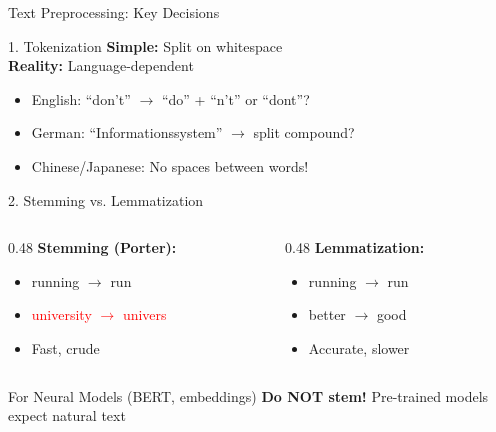\documentclass[aspectratio=169]{beamer}
\begin{document}
\begin{frame}[shrink=25]{Text Preprocessing: Key Decisions}
\begin{block}{1. Tokenization}
\textbf{Simple:} Split on whitespace \\
\textbf{Reality:} Language-dependent
\begin{itemize}
    \item English: ``don't'' $\rightarrow$ ``do'' + ``n't'' or ``dont''?
    \item German: ``Informationssystem'' $\rightarrow$ split compound?
    \item Chinese/Japanese: No spaces between words!
\end{itemize}
\end{block}

\begin{block}{2. Stemming vs. Lemmatization}
\begin{columns}
\begin{column}{0.48\textwidth}
\textbf{Stemming (Porter):}
\begin{itemize}
    \item running $\rightarrow$ run
    \item \textcolor{red}{university $\rightarrow$ univers}
    \item Fast, crude
\end{itemize}
\end{column}
\begin{column}{0.48\textwidth}
\textbf{Lemmatization:}
\begin{itemize}
    \item running $\rightarrow$ run
    \item better $\rightarrow$ good
    \item Accurate, slower
\end{itemize}
\end{column}
\end{columns}
\end{block}

\begin{alertblock}{For Neural Models (BERT, embeddings)}
\textbf{Do NOT stem!} Pre-trained models expect natural text
\end{alertblock}
\end{frame}
\end{document}
